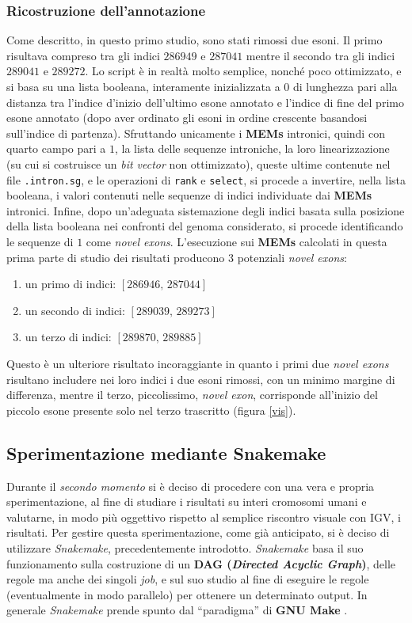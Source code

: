 \documentclass[a4paper,12pt, oneside]{book}
\begin{document}
\subsubsection{Ricostruzione dell'annotazione}
Come descritto, in questo primo studio, sono stati rimossi due esoni. Il primo
risultava compreso tra gli indici $286949$ e $287041$ mentre il secondo tra gli
indici $289041$ e $289272$. Lo script è in realtà molto semplice, nonché poco
ottimizzato, e si basa su una lista booleana, interamente inizializzata a $0$ di
lunghezza pari alla distanza tra l'indice d'inizio dell'ultimo esone annotato e
l'indice di fine del primo esone annotato (dopo aver ordinato gli esoni in
ordine crescente basandosi sull'indice di partenza). Sfruttando unicamente i
\textbf{MEMs} intronici, quindi con quarto campo pari a $1$, la lista delle
sequenze introniche, la loro linearizzazione (su cui si costruisce un
\textit{bit vector} non ottimizzato), queste ultime contenute nel file
\texttt{.intron.sg}, e le operazioni di \texttt{rank} e \texttt{select}, si
procede a invertire, nella lista booleana, i valori contenuti nelle sequenze di
indici individuate dai \textbf{MEMs} intronici. Infine, dopo un'adeguata
sistemazione degli indici basata sulla posizione della lista booleana nei
confronti del genoma considerato, si procede identificando le sequenze di $1$
come \textit{novel exons}. L'esecuzione sui \textbf{MEMs} calcolati in questa
prima parte di studio dei risultati producono 3 potenziali \textit{novel exons}:
\begin{enumerate}
  \item un primo di indici: $[286946,\,287044]$
  \item un secondo di indici: $[289039,\,289273]$
  \item un terzo di indici: $[289870,\,289885]$
\end{enumerate}
Questo è un ulteriore risultato incoraggiante in quanto i primi due
\textit{novel exons} risultano includere nei loro indici i due esoni rimossi,
con un minimo margine di differenza, mentre il terzo, piccolissimo,
\textit{novel exon}, corrisponde all'inizio del piccolo esone presente solo nel
terzo trascritto (figura \ref{vis}).
\subsection{Sperimentazione mediante Snakemake}
Durante il \textit{secondo momento} si è deciso di procedere con una vera e
propria sperimentazione, al fine di studiare i risultati su interi cromosomi
umani e valutarne, in modo più oggettivo rispetto al semplice riscontro visuale
con IGV, i risultati. Per gestire questa sperimentazione, come già anticipato,
si è deciso di utilizzare \textit{Snakemake}, precedentemente
introdotto. \textit{Snakemake} basa il suo funzionamento sulla costruzione di un
\textbf{DAG (\textit{Directed Acyclic Graph})}, delle regole ma anche
dei singoli \textit{job}, e sul suo studio
al fine di eseguire le regole (eventualmente in modo parallelo) per ottenere un
determinato output. In generale \textit{Snakemake} prende spunto dal
``paradigma'' di \textbf{GNU Make} \cite{make}.
\end{document}
